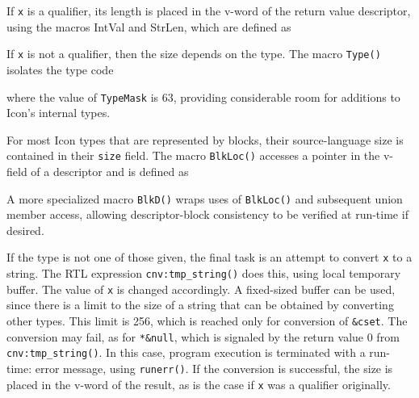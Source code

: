 
If \texttt{x} is a qualifier, its length is placed in the v-word of
the return value descriptor, using the macros IntVal and StrLen, which
are defined as


If \texttt{x} is not a qualifier, then the size depends on the
type. The macro \texttt{Type()} isolates the type code


\noindent where the value of \texttt{TypeMask} is 63, providing
considerable room for additions to Icon's internal types.

For most Icon types that are represented by blocks, their
source-language size is contained in their \texttt{size} field. The
macro \texttt{BlkLoc()} accesses a pointer in the v-field of a
descriptor and is defined as


A more specialized macro \texttt{BlkD()} wraps uses of
\texttt{BlkLoc()} and subsequent union member access, allowing
descriptor-block consistency to be verified at run-time if desired.


If the type is not one of those given, the final task is an attempt to
convert \texttt{x} to a string. The RTL expression
\texttt{cnv:tmp\_string()} does this, using local temporary
buffer. The value of \texttt{x} is changed accordingly. A fixed-sized
buffer can be used, since there is a limit to the size of a string
that can be obtained by converting other types. This limit is 256,
which is reached only for conversion of \texttt{\&cset}. The
conversion may fail, as for \texttt{*\&null}, which is signaled by the
return value 0 from \texttt{cnv:tmp\_string()}. In this case, program
execution is terminated with a run-time: error message, using
\texttt{runerr()}. If the conversion is successful, the size is placed
in the v-word of the result, as is the case if \texttt{x} was a
qualifier originally.

